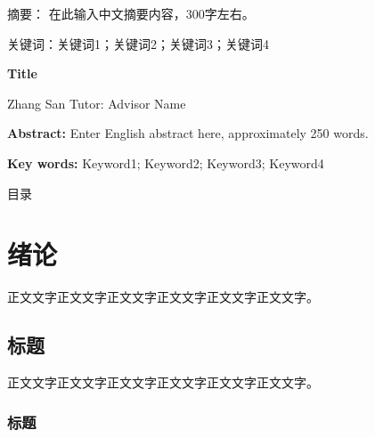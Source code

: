 \documentclass[a4paper,12pt]{ctexart}
\begin{document}
{\heiti\fontsize{12pt}{12pt}\selectfont 摘要：}\songti\fontsize{12pt}{12pt}\selectfont
在此输入中文摘要内容，300字左右。

\vspace{1cm}
{\heiti\fontsize{12pt}{12pt}\selectfont 关键词：}\songti\fontsize{12pt}{12pt}\selectfont 关键词1；关键词2；关键词3；关键词4

\clearpage

\thispagestyle{empty}
\begin{center}
{\bfseries\fontsize{18pt}{18pt}\selectfont Title}
\end{center}
\vspace{0.5cm}
\begin{center}
\fontsize{14pt}{14pt}\selectfont Zhang San \hspace{2em} Tutor: Advisor Name
\end{center}
\vspace{1cm}

{\bfseries\fontsize{14pt}{14pt}\selectfont Abstract:} \fontsize{14pt}{14pt}\selectfont
Enter English abstract here, approximately 250 words.

\vspace{1cm}
{\bfseries\fontsize{14pt}{14pt}\selectfont Key words:} \fontsize{14pt}{14pt}\selectfont Keyword1; Keyword2; Keyword3; Keyword4

\clearpage

\thispagestyle{empty}
\begin{center}
{\heiti\fontsize{18pt}{18pt}\selectfont 目\hspace{2em}录}
\end{center}
\vspace{1cm}
\tableofcontents
\clearpage

\setcounter{page}{1}

\section{绪论}

正文文字正文文字正文文字正文文字正文文字正文文字。

\subsection{标题}

正文文字正文文字正文文字正文文字正文文字正文文字。

\subsubsection{标题}
\end{document}
